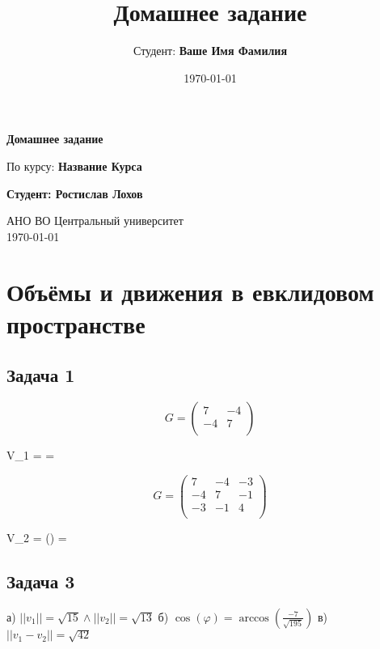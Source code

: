\documentclass[a4paper,12pt]{article}
\title{Домашнее задание}
\author{Студент: \textbf{Ваше Имя Фамилия}}
\date{\today}
\begin{document}
\begin{titlepage}
    \centering
    \vspace*{1cm}

    \Huge
    \textbf{Домашнее задание}

    \vspace{0.5cm}
    \LARGE
    По курсу: \textbf{Название Курса}

    \vspace{1.5cm}

    \textbf{Студент: Ростислав Лохов}

    \vfill

    \Large
    АНО ВО Центральный университет\\
    \vspace{0.3cm}
    \today

\end{titlepage}

\tableofcontents
\newpage

\section{Объёмы и движения в евклидовом пространстве}

\subsection{Задача 1}

\[
G = \begin{pmatrix}
    7 & -4 \\
    -4 & 7 \\
\end{pmatrix}
\]

V_1 =  = 


\[
G = \begin{pmatrix}
    7 & -4 & -3 \\
    -4 & 7 & -1 \\
    -3 & -1 & 4 \\
\end{pmatrix}
\]

V_2 = \det() = 

\subsection{Задача 3}
а) $||v_1|| = \sqrt{15} \land ||v_2|| = \sqrt{13}$
б) $\cos(\varphi) = \arccos(\frac{-7}{\sqrt{195}})$
в) $||v_1-v_2|| = \sqrt{42}$
\end{document}
